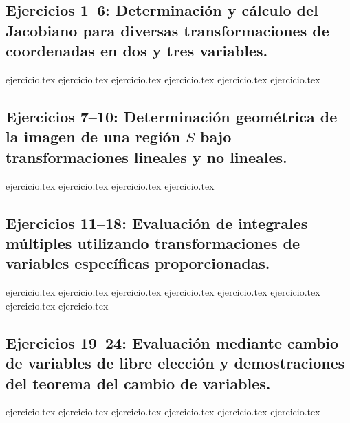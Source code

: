 
\subsection*{Ejercicios 1--6: Determinación y cálculo del Jacobiano para diversas transformaciones de coordenadas en dos y tres variables.}
\begin{enumerate}
    {ejercicio.tex}
    {ejercicio.tex}
    {ejercicio.tex}
    {ejercicio.tex}
    {ejercicio.tex}
    {ejercicio.tex}
\end{enumerate}

\subsection*{Ejercicios 7--10: Determinación geométrica de la imagen de una región $S$ bajo transformaciones lineales y no lineales.}
\begin{enumerate}
    \setcounter{enumi}{6}
    {ejercicio.tex}
    {ejercicio.tex}
    {ejercicio.tex}
    {ejercicio.tex}
\end{enumerate}

\subsection*{Ejercicios 11--18: Evaluación de integrales múltiples utilizando transformaciones de variables específicas proporcionadas.}
\begin{enumerate}
    \setcounter{enumi}{10}
    {ejercicio.tex}
    {ejercicio.tex}
    {ejercicio.tex}
    {ejercicio.tex}
    {ejercicio.tex}
    {ejercicio.tex}
    {ejercicio.tex}
    {ejercicio.tex}
\end{enumerate}

\subsection*{Ejercicios 19--24: Evaluación mediante cambio de variables de libre elección y demostraciones del teorema del cambio de variables.}
\begin{enumerate}
    \setcounter{enumi}{18}
    {ejercicio.tex}
    {ejercicio.tex}
    {ejercicio.tex}
    {ejercicio.tex}
    {ejercicio.tex}
    {ejercicio.tex}
\end{enumerate}
